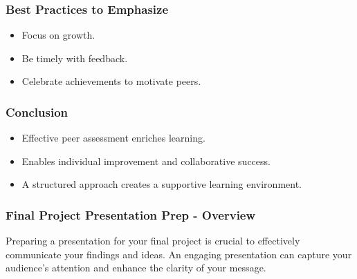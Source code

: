 \documentclass[aspectratio=169]{beamer}
\begin{document}
\begin{frame}[fragile]
    \frametitle{Best Practices to Emphasize}
    \begin{itemize}
        \item Focus on growth.
        \item Be timely with feedback.
        \item Celebrate achievements to motivate peers.
    \end{itemize}
\end{frame}

\begin{frame}[fragile]
    \frametitle{Conclusion}
    \begin{itemize}
        \item Effective peer assessment enriches learning.
        \item Enables individual improvement and collaborative success.
        \item A structured approach creates a supportive learning environment.
    \end{itemize}
\end{frame}

\begin{frame}[fragile]
    \frametitle{Final Project Presentation Prep - Overview}
    Preparing a presentation for your final project is crucial to effectively communicate your findings and ideas. 
    An engaging presentation can capture your audience's attention and enhance the clarity of your message.
\end{frame}
\end{document}
